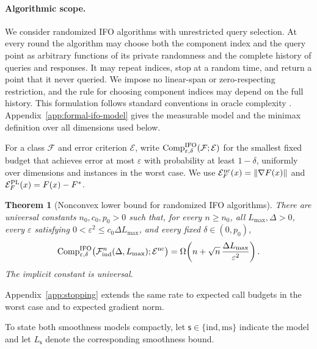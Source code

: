 \documentclass{article}
\newtheorem{theorem}{Theorem}[section]
\theoremstyle{definition}
\begin{document}
\paragraph{Algorithmic scope.}
We consider randomized IFO algorithms with unrestricted query selection.  At
every round the algorithm may choose both the component index and the query
point as arbitrary functions of its private randomness and the complete
history of queries and responses.  It may repeat indices, stop at a random
time, and return a point that it never queried.  We impose no linear-span or
zero-respecting restriction, and the rule for choosing component indices may
depend on the full history.
This formulation follows standard conventions in oracle complexity
\citep{carmon2020lower1,arjevani2023stochastic}.
Appendix~\ref{app:formal-ifo-model} gives the measurable model and the
minimax definition over all dimensions used below.

For a class $\mathcal F$ and error criterion $\mathcal E$, write
$\operatorname{Comp}_{\varepsilon,\delta}^{\rm IFO}
(\mathcal F;\mathcal E)$ for the smallest fixed budget that achieves
error at most $\varepsilon$ with probability at least $1-\delta$, uniformly
over dimensions and instances in the worst case.  We use
$\mathcal E_F^{\rm nc}(x)=\|\nabla F(x)\|$ and
$\mathcal E_F^{\rm PL}(x)=F(x)-F^*$.

\begin{theorem}[Nonconvex lower bound for randomized IFO algorithms]
\label{thm:nonconvex-main}
There are universal constants $n_0,c_0,p_0>0$ such that, for every
$n\ge n_0$, all $L_{\max},\Delta>0$, every $\varepsilon$ satisfying
$0<\varepsilon^2\le c_0\Delta L_{\max}$, and every fixed
$\delta\in(0,p_0)$,
\begin{equation}
 \operatorname{Comp}_{\varepsilon,\delta}^{\rm IFO}
 \bigl(\mathcal F_{\rm ind}^n(\Delta,L_{\max});\mathcal E^{\rm nc}\bigr)
 =\Omega\!\left(n+\sqrt n\,
 \frac{\Delta L_{\max}}{\varepsilon^2}\right).
 \label{eq:nonconvex-main-rate}
\end{equation}
The implicit constant is universal.
\end{theorem}

Appendix~\ref{app:stopping} extends the same rate to expected call budgets in
the worst case and to expected gradient norm.

To state both smoothness models compactly, let
$\mathsf s\in\{\mathrm{ind},\mathrm{ms}\}$ indicate the model and let
$L_{\mathsf s}$ denote the corresponding smoothness bound.
\end{document}
